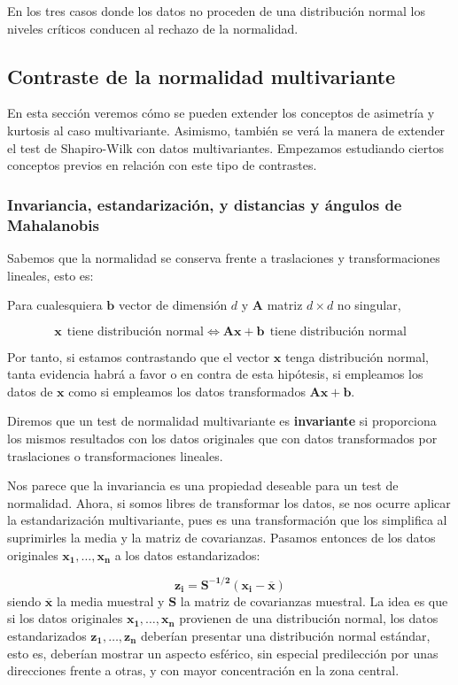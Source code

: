 \documentclass[
  a4paper,
  oneside]{scrbook}
\theoremstyle{definition}
\theoremstyle{definition}
\theoremstyle{definition}
\theoremstyle{definition}
\theoremstyle{remark}
\begin{document}
\normalsize

En los tres casos donde los datos no proceden de una distribución normal
los niveles críticos conducen al rechazo de la normalidad.

\subsection{Contraste de la normalidad multivariante}\label{secmul}

En esta sección veremos cómo se pueden extender los conceptos de
asimetría y kurtosis al caso multivariante. Asimismo, también se verá la
manera de extender el test de Shapiro-Wilk con datos multivariantes.
Empezamos estudiando ciertos conceptos previos en relación con este tipo
de contrastes.

\subsubsection{Invariancia, estandarización, y distancias y ángulos de Mahalanobis}\label{invariancia-estandarizacion-y-distancias-y-angulos-de-mahalanobis}

Sabemos que la normalidad se conserva frente a traslaciones y
transformaciones lineales, esto es:

Para cualesquiera \(\bm{b}\) vector de dimensión \(d\) y \(\bm{A}\) matriz
\(d\times d\) no singular,

\[\bm{x}\ \ \mbox{tiene distribución normal} \Leftrightarrow\bm{A}\bm{x}+\bm{b}\ \ \mbox{tiene distribución normal}\]

Por tanto, si estamos contrastando que el vector \(\bm{x}\) tenga
distribución normal, tanta evidencia habrá a favor o en contra de esta
hipótesis, si empleamos los datos de \(\bm{x}\) como si empleamos los
datos transformados \(\bm{A}\bm{x}+\bm{b}\).

Diremos que un test de normalidad multivariante es \textbf{invariante} si
proporciona los mismos resultados con los datos originales que con datos
transformados por traslaciones o transformaciones lineales.

Nos parece que la invariancia es una propiedad deseable para un test de
normalidad. Ahora, si somos libres de transformar los datos, se nos
ocurre aplicar la estandarización multivariante, pues es una
transformación que los simplifica al suprimirles la media y la matriz de
covarianzas. Pasamos entonces de los datos originales \(\bm{x_1},\ldots,\bm{x_n}\) a los datos estandarizados:

\[\bm{z_i}=\bm{S^{-1/2}}\left(\bm{x_i}-\overline{\bm{x}}\right)\] siendo
\(\overline{\bm{x}}\) la media muestral y \(\bm{S}\) la matriz de covarianzas
muestral. La idea es que si los datos originales
\(\bm{x_1},\ldots,\bm{x_n}\) provienen de una distribución normal, los
datos estandarizados \(\bm{z_1},\ldots,\bm{z_n}\) deberían presentar una
distribución normal estándar, esto es, deberían mostrar un aspecto
esférico, sin especial predilección por unas direcciones frente a otras,
y con mayor concentración en la zona central.
\end{document}
